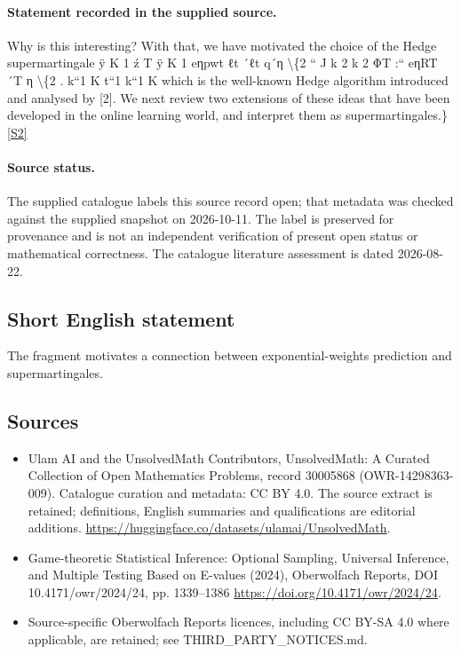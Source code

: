 \documentclass[11pt]{article}
\newcommand{\sref}[2]{\hyperlink{source:#1:#2}{[S#2]}}
\begin{document}
\paragraph{Statement recorded in the supplied source.}
Why is this interesting? With that, we have motivated the choice of the Hedge supermartingale ÿ K 1 ź T ÿ K 1 eηpwt ℓt ´ℓt q´η \textbackslash{}\{2 “ J k 2 k 2 ΦT :“ eηRT ´T η \textbackslash{}\{2 . k“1 K t“1 k“1 K which is the well-known Hedge algorithm introduced and analysed by [2]. We next review two extensions of these ideas that have been developed in the online learning world, and interpret them as supermartingales.\} \sref{30005868}{2}
\paragraph{Source status.}
The supplied catalogue labels this source record open; that metadata was checked against the supplied snapshot on 2026-10-11. The label is preserved for provenance and is not an independent verification of present open status or mathematical correctness. The catalogue literature assessment is dated 2026-08-22.
\subsection{Short English statement}
The fragment motivates a connection between exponential-weights prediction and supermartingales.
\subsection{Sources}
\begin{itemize}
\item[\hypertarget{source:30005868:1}{S1}] Ulam AI and the UnsolvedMath Contributors, UnsolvedMath: A Curated Collection of Open Mathematics Problems, record 30005868 (OWR-14298363-009). Catalogue curation and metadata: CC BY 4.0. The source extract is retained; definitions, English summaries and qualifications are editorial additions.
\url{https://huggingface.co/datasets/ulamai/UnsolvedMath}.
\item[\hypertarget{source:30005868:2}{S2}] Game-theoretic Statistical Inference: Optional Sampling, Universal Inference, and Multiple Testing Based on E-values (2024), Oberwolfach Reports, DOI 10.4171/owr/2024/24, pp. 1339--1386
\url{https://doi.org/10.4171/owr/2024/24}.
\item Source-specific Oberwolfach Reports licences, including CC BY-SA 4.0 where applicable, are retained; see THIRD\_PARTY\_NOTICES.md.
\end{itemize}
\end{document}
